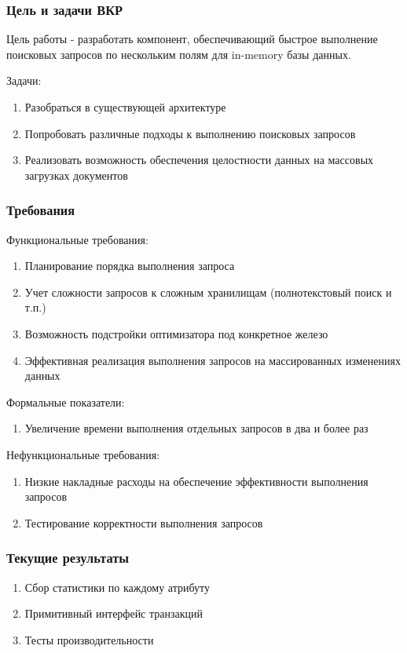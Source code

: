 \documentclass{beamer}
\begin{document}
\begin{frame}\frametitle{Цель и задачи ВКР}
    Цель работы - разработать компонент, обеспечивающий быстрое выполнение поисковых запросов по нескольким полям для in-memory базы данных.
    
    Задачи:
    \begin{enumerate}
        \item Разобраться в существующей архитектуре
        \item Попробовать различные подходы к выполнению поисковых запросов
        \item Реализовать возможность обеспечения целостности данных на массовых загрузках документов
    \end{enumerate}
\end{frame}

\begin{frame}\frametitle{Требования}
    Функциональные требования:
        \begin{enumerate}\itemsep0pt \parskip0pt 
            \item Планирование порядка выполнения запроса
            \item Учет сложности запросов к сложным хранилищам (полнотекстовый поиск и т.п.)
            \item Возможность подстройки оптимизатора под конкретное железо
            \item Эффективная реализация выполнения запросов на массированных изменениях данных
        \end{enumerate}
    Формальные показатели:
        \begin{enumerate}\itemsep0pt \parskip0pt  
            \item Увеличение времени выполнения отдельных запросов в два и более раз
        \end{enumerate}
    Нефункциональные требования:
        \begin{enumerate}\itemsep0pt \parskip0pt  
                \item Низкие накладные расходы на обеспечение эффективности выполнения запросов
                \item Тестирование корректности выполнения запросов
        \end{enumerate}
\end{frame}


\begin{frame}\frametitle{Текущие результаты}
    \begin{enumerate}
        \item Сбор статистики по каждому атрибуту
        \item Примитивный интерфейс транзакций
        \item Тесты производительности
    \end{enumerate}
\end{frame}
\end{document}
